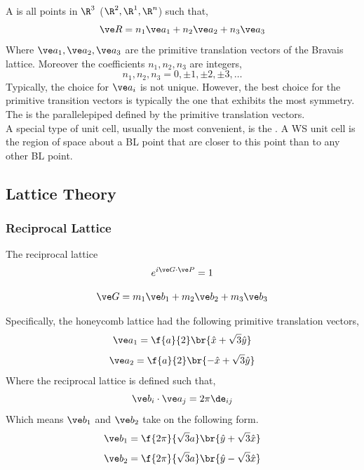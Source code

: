 \documentclass{article}
\begin{document}
\begin{center}
\end{center}

A  is all points in $\R^{3}$ ($\R^{2}, \R^{1}, \R^{n}$) such that,
\[ \ve R = n_1 \ve a_1 + n_2 \ve a_2 + n_3 \ve a_3 \]
Where $\ve a_1, \ve a_2, \ve a_3$ are the primitive translation vectors of the Bravais lattice. Moreover the coefficients $n_1, n_2, n_3$ are integers,
\[ n_1, n_2, n_3 = 0, \pm 1, \pm 2, \pm 3, \ldots \]
Typically, the choice for $\ve a_i$ is not unique. However, the best choice for the primitive transition vectors is typically the one that exhibits the most symmetry. \\

The  is the parallelepiped defined by the primitive translation vectors.\\

A special type of unit cell, usually the most convenient, is the . A WS unit cell is the region of space about a BL point that are closer to this point than to any other BL point.

\subsection{Lattice Theory}


\subsubsection{Reciprocal Lattice}
The reciprocal lattice
\[ e^{i \ve G \cdot \ve P} = 1 \]

\[ \ve G = m_1 \ve b_1 + m_2 \ve b_2 + m_3 \ve b_3\]

Specifically, the honeycomb lattice had the following primitive translation vectors,
\[ \ve a_1 = \f{a}{2} \br{\hat x + \sqrt{3} \hat y} \]
\[ \ve a_2 = \f{a}{2} \br{-\hat x + \sqrt{3} \hat y} \]
Where the reciprocal lattice is defined such that,
\[ \ve b_{i} \cdot \ve a_{j} = 2 \pi \de_{ij}  \]
Which means $\ve b_1$ and $\ve b_2$ take on the following form.
\[ \ve b_1 = \f{2\pi}{\sqrt{3} a} \br{\hat y + \sqrt{3} \hat x} \]
\[ \ve b_2 = \f{2\pi}{\sqrt{3} a} \br{\hat y - \sqrt{3} \hat x} \]
\end{document}
